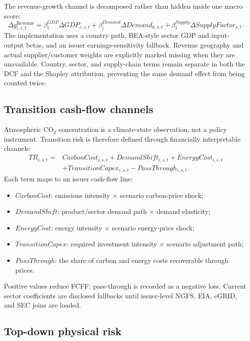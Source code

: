 \documentclass[10pt]{article}
\begin{document}
The revenue-growth channel is decomposed rather than hidden inside one macro score:
\begin{equation}
\Delta g^{\mathrm{Revenue}}_{i,s,t}
=\beta^{GDP}_{i}\Delta GDP_{c,s,t}
+\beta^{Demand}_{i}\Delta Demand_{k,s,t}
+\beta^{Supply}_{i}\Delta SupplyFactor_{s,t}.
\end{equation}
The implementation uses a country path, BEA-style sector GDP and input-output betas, and an issuer earnings-sensitivity fallback. Revenue geography and actual supplier/customer weights are explicitly marked missing when they are unavailable. Country, sector, and supply-chain terms remain separate in both the DCF and the Shapley attribution, preventing the same demand effect from being counted twice.

\subsection{Transition cash-flow channels}

Atmospheric CO$_2$ concentration is a climate-state observation, not a policy instrument. Transition risk is therefore defined through financially interpretable channels:
\begin{align}
TR_{i,s,t}={}&CarbonCost_{i,s,t}+DemandShift_{i,s,t}+EnergyCost_{i,s,t}\nonumber\\
&+TransitionCapex_{i,s,t}-PassThrough_{i,s,t}.
\end{align}
Each term maps to an issuer cash-flow line:
\begin{itemize}
  \item $CarbonCost$: emissions intensity $\times$ scenario carbon-price shock;
  \item $DemandShift$: product/sector demand path $\times$ demand elasticity;
  \item $EnergyCost$: energy intensity $\times$ scenario energy-price shock;
  \item $TransitionCapex$: required investment intensity $\times$ scenario adjustment path;
  \item $PassThrough$: the share of carbon and energy costs recoverable through prices.
\end{itemize}
Positive values reduce FCFF; pass-through is recorded as a negative loss. Current sector coefficients are disclosed fallbacks until issuer-level NGFS, EIA, eGRID, and SEC joins are loaded.

\subsection{Top-down physical risk}
\end{document}
